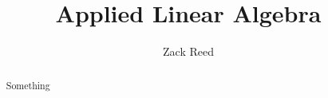 \documentclass{xourse}
\author{Zack Reed}
\title{Applied Linear Algebra}
\begin{document}
\begin{abstract}
Something
\end{abstract}
\maketitle

\end{document}

